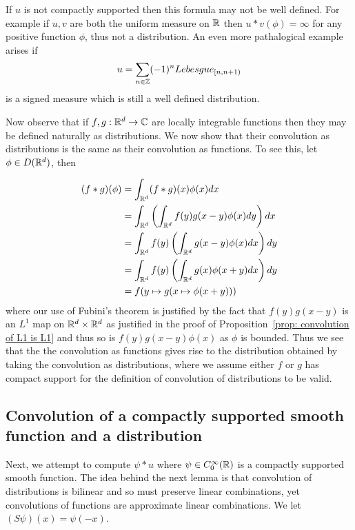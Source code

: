 \documentclass[twoside, a4paper, 10pt]{amsart}
\begin{document}
\begin{eg} If $u$ is not compactly supported then this formula may not be well defined. For example if $u,v$ are both the uniform measure on $\mathbb{R}$ then $u*v(\phi) = \infty$ for any positive function $\phi$, thus not a distribution. An even more pathalogical example arises if $$u = \sum_{n \in \mathbb{Z}} (-1)^n Lebesgue_{[n,n+1)}$$ is a signed measure which is still a well defined distribution.

\end{eg}

Now observe that if $f,g:\mathbb{R}^d \to \mathbb{C}$ are locally integrable functions then they may be defined naturally as distributions. We now show that their convolution as distributions is the same as their convolution as functions. To see this, let $\phi \in D(\mathbb{R}^d)$, then 

\begin{align*} (f * g)(\phi) &= \int_{\mathbb{R}^d} (f*g)(x) \phi(x) dx \\ &= \int_{\mathbb{R}^d} \left( \int_{\mathbb{R}^d} f(y)g(x-y) \phi(x) dy \right) dx \\ &= \int_{\mathbb{R}^d} f(y)  \left( \int_{\mathbb{R}^d} g(x-y)\phi(x) dx \right)  dy \\ &=  \int_{\mathbb{R}^d} f(y)  \left( \int_{\mathbb{R}^d} g(x)\phi(x+y) dx \right)  dy \\ &= f(y \mapsto g(x \mapsto \phi(x+y))) \end{align*} where our use of Fubini's theorem is justified by the fact that $f(y)g(x-y)$ is an $L^1$ map on $\mathbb{R}^d \times \mathbb{R}^d$ as justified in the proof of Proposition~\ref{prop: convolution of L1 is L1} and thus so is $f(y)g(x-y)\phi(x)$ as $\phi$ is bounded. Thus we see that the the convolution as functions gives rise to the distribution obtained by taking the convolution as distributions, where we assume either $f$ or $g$ has compact support for the definition of convolution of distributions to be valid.

\subsection{Convolution of a compactly supported smooth function and a distribution}

Next, we attempt to compute $\psi * u$ where $\psi \in C_0^{\infty}(\mathbb{R})$ is a compactly supported smooth function. The idea behind the next lemma is that convolution of distributions is bilinear and so must preserve linear combinations, yet convolutions of functions are approximate linear combinations. We let $(S\psi)(x) = \psi(-x)$.
\end{document}
